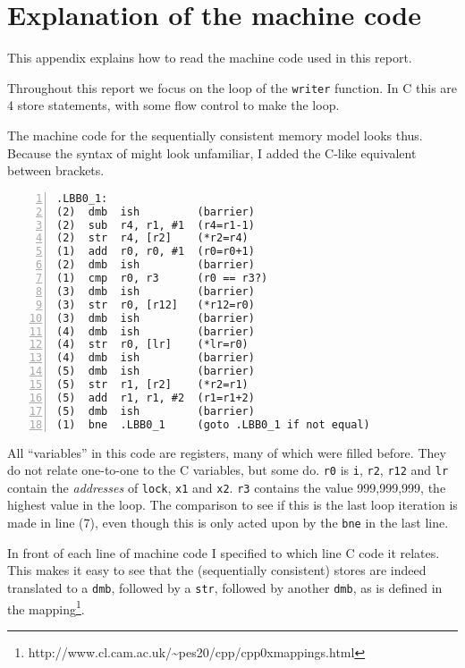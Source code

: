 \documentclass[journal]{IEEEtran}
\begin{document}



\appendices

\section{Explanation of the machine code}
\label{app:seqlock-sc-mc-explained}

This appendix explains how to read the machine code used in this report.

Throughout this report we focus on the loop of the \texttt{writer} function. In C this are 4 store statements, with some flow control to make the loop.



The machine code for the sequentially consistent memory model looks thus.
Because the syntax of might look unfamiliar, I added the C-like equivalent between brackets.

\begin{lstlisting}[frame=single,xleftmargin=2em,numbers=left]
   .LBB0_1:              
(2)  dmb  ish         (barrier)
(2)  sub  r4, r1, #1  (r4=r1-1)
(2)  str  r4, [r2]    (*r2=r4) 
(1)  add  r0, r0, #1  (r0=r0+1)     
(2)  dmb  ish         (barrier)    
(1)  cmp  r0, r3      (r0 == r3?) 
(3)  dmb  ish         (barrier)
(3)  str  r0, [r12]   (*r12=r0)   
(3)  dmb  ish         (barrier)
(4)  dmb  ish         (barrier)
(4)  str  r0, [lr]    (*lr=r0)
(4)  dmb  ish         (barrier)
(5)  dmb  ish         (barrier)
(5)  str  r1, [r2]    (*r2=r1)
(5)  add  r1, r1, #2  (r1=r1+2)
(5)  dmb  ish         (barrier)
(1)  bne  .LBB0_1     (goto .LBB0_1 if not equal)
\end{lstlisting}

All ``variables'' in this code are registers, many of which were filled before.
They do not relate one-to-one to the C variables, but some do.
\texttt{r0} is \texttt{i}, \texttt{r2}, \texttt{r12} and \texttt{lr} contain the \emph{addresses} of \texttt{lock}, \texttt{x1} and \texttt{x2}.
\texttt{r3} contains the value 999,999,999, the highest value in the loop.
The comparison to see if this is the last loop iteration is made in line (7), even though this is only acted upon by the \texttt{bne} in the last line.

In front of each line of machine code I specified to which line C code it relates.
This makes it easy to see that the (sequentially consistent) stores are indeed translated to a \texttt{dmb}, followed by a \texttt{str}, followed by another \texttt{dmb}, as is defined in the mapping\footnote{http://www.cl.cam.ac.uk/\textasciitilde{}pes20/cpp/cpp0xmappings.html}.
\end{document}
